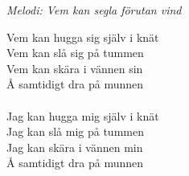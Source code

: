 {\footnotesize\textit{Melodi: Vem kan segla förutan vind}}\par
\vspace{10pt}
Vem kan hugga sig själv i knät\\
Vem kan slå sig på tummen\\
Vem kan skära i vännen sin\\
Å samtidigt dra på munnen\\
\\
Jag kan hugga mig själv i knät\\
Jag kan slå mig på tummen\\
Jag kan skära i vännen min\\
Å samtidigt dra på munnen
